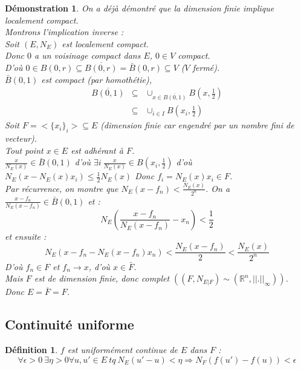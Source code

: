 \documentclass[a4paper, oneside]{report}
\theoremstyle{break}
\newtheorem{defi}[thm]{Définition}
\newtheorem*{demo}{Démonstration}
\newcommand{\R}{\mathbb{R}}
\newcommand{\fracun}[1]{\frac{1}{#1}}
\begin{document}
\begin{demo}
On a déjà démontré que la dimension finie implique localement compact.\\
Montrons l'implication inverse :\\
Soit $(E,N_E)$ est localement compact.\\
Donc $0$ a un voisinage compact dans $E$, $0\in V$ compact.\\
D'où $0\in B(0,r)\subseteq \overline{B(0,r)} = \bar{B}(0,r) \subseteq V$ ($V$ fermé).\\
$\bar{B}(0,1)$ est compact (par homothétie), 
$$\begin{array}{lll}
\overline{B(0,1)} &\subseteq & \cup_{x\in \overline{B(0,1)}} B(x,\fracun{2})\\
&\subseteq & \cup_{i\in I}B(x_i, \fracun{2})
\end{array}$$
Soit $F = <\{x_i\}_i> \subseteq E$ (dimension finie car engendré par un nombre fini de vecteur).\\
Tout point $x\in E$ est adhérant à $F$.\\
$\frac{x}{N_E(x)} \in \bar{B}(0,1)$ d'où $\exists i~\frac{x}{N_E(x)} \in B(x_i, \fracun{2})$ d'où $N_E(x-N_E(x)x_i)\leq \fracun{2}N_E(x)$
Donc $f_i = N_E(x)x_i \in F$.\\
Par récurrence, on montre que $N_E(x-f_n)<\frac{N_E(x)}{2^n}$. On a $\frac{x-f_n}{N_E(x-f_n)} \in \bar{B}(0,1)$ et :
$$N_E(\frac{x-f_n}{N_E(x-f_n)} - x_n) < \fracun{2}$$
et ensuite :
$$N_E(x-f_n-N_E(x-f_n)x_n)<\frac{N_E(x-f_n)}{2}<\frac{N_E(x)}{2^n}$$
D'où $f_n \in F$ et $f_n \rightarrow x$, d'où $x\in \bar{F}$.\\
Mais $F$ est de dimension finie, donc complet $((F,N_{E|F})\sim (\R^n,||.||_\infty))$.\\
Donc $E=\bar{F}=F$.
\end{demo}

\subsection{Continuité uniforme}

\begin{defi}
$f$ est uniformément continue de $E$ dans $F$ :
$$\forall \epsilon >0~\exists \eta >0 \forall u,u'\in E~tq~N_E(u'-u)<\eta \Rightarrow N_F(f(u')-f(u))<\epsilon$$
\end{defi}
\end{document}
